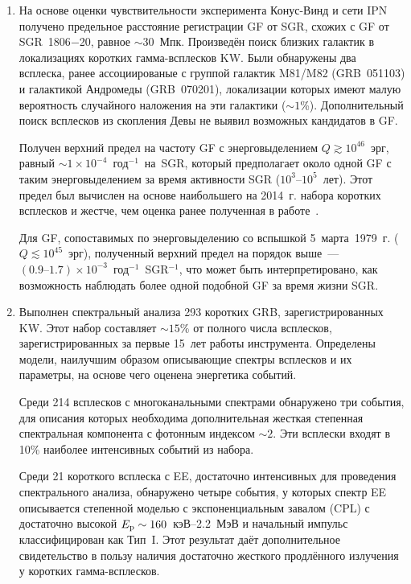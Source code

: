 \begin{enumerate}
\item На основе оценки чувствительности эксперимента Конус-Винд и сети IPN получено 
    предельное расстояние регистрации GF от SGR, схожих с GF от SGR~1806$-$20, 
    равное $\sim 30$~Мпк. 
    Произведён поиск близких галактик в локализациях коротких гамма-всплесков KW. 
    Были обнаружены два всплеска, ранее 
    ассоциированые с группой галактик M81/M82 (GRB~051103) и галактикой Андромеды (GRB~070201),
    локализации которых имеют малую вероятность случайного наложения на эти галактики ($\sim 1$\%).
    Дополнительный поиск всплесков из скопления Девы не выявил возможных кандидатов в GF.
    
    Получен верхний предел на частоту GF с энерговыделением $Q \gtrsim 10^{46}$~эрг, равный
    $\sim 1 \times 10^{-4}$~год$^{-1}$~на~SGR, который предполагает 
    около одной GF с таким энерговыделением за время активности SGR ($10^3\textrm{--}10^5$~лет). 
    Этот предел был вычислен на основе наибольшего на 2014~г.  
    набора коротких всплесков и жестче, чем оценка ранее полученная в работе~\citep{Ofek_2007ApJ}.
    
    Для GF, сопоставимых по энерговыделению со вспышкой 5~марта~1979~г. ($Q \lesssim 10^{45}$~эрг), 
    полученный верхний предел на порядок выше~--- $(0.9\textrm{--}1.7)\times 10^{-3}$~год$^{-1}$~SGR$^{-1}$, 
    что может быть интерпретировано, как возможность наблюдать более одной подобной GF за время жизни SGR.
  
\item Выполнен спектральный анализа 293 коротких GRB, зарегистрированных KW. 
    Этот набор составляет $\sim 15$\% от полного числа всплесков, зарегистрированных 
    за первые 15~лет работы инструмента.
    Определены модели, наилучшим образом описывающие спектры всплесков и их параметры,
    на основе чего оценена энергетика событий. 
    
    Среди 214 всплесков с многоканальными спектрами обнаружено три
    события, для описания которых необходима дополнительная жесткая степенная 
    спектральная компонента с фотонным индексом $\sim 2$. Эти всплески входят в 10\%
    наиболее интенсивных событий из набора. 
    
    Среди 21 короткого всплеска с EE, достаточно интенсивных
    для проведения спектрального анализа, обнаружено четыре события, у которых 
    спектр EE описывается степенной моделью с экспоненциальным завалом (CPL) 
    с достаточно высокой $E_{\mathrm{p}} \sim 160$~кэВ--2.2~МэВ и начальный импульс 
    классифицирован как Тип~I. Этот результат даёт дополнительное свидетельство 
    в пользу наличия достаточно жесткого продлённого излучения у коротких гамма-всплесков. 
    

\end{enumerate}

